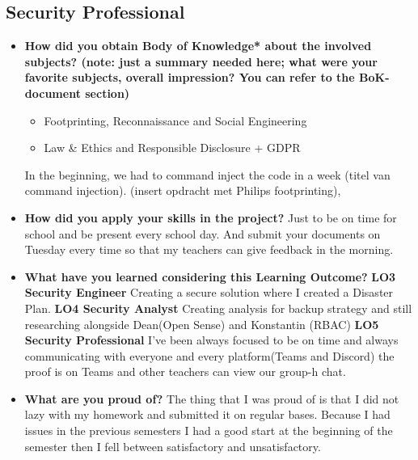 \documentclass[12pt, letterpaper]{article}
\begin{document}
\newpage
\subsection{Security Professional}
\begin{itemize}
\item \textbf{How did you obtain Body of Knowledge* about the involved subjects? (note: just a summary needed here; what were your favorite subjects, overall impression? You can refer to the BoK-document section)}
\begin{itemize}
    \item Footprinting, Reconnaissance and Social Engineering
    \item Law \& Ethics and Responsible Disclosure + GDPR
\end{itemize}
In the beginning, we had to command inject the code in a week (titel van command injection). (insert opdracht met Philips footprinting), 
\item \textbf{How did you apply your skills in the project?}
\hfill\break
\hfill\break
Just to be on time for school and be present every school day. And submit your documents on Tuesday every time so that my teachers can give feedback in the morning.
\item \textbf{What have you learned considering this Learning Outcome?}
\break
\textbf{LO3 Security Engineer}
\hfill\break
Creating a secure solution where I created a Disaster Plan.
\hfill\break
\textbf{LO4 Security Analyst}
\hfill\break
Creating analysis for backup strategy and still researching alongside Dean(Open Sense) and Konstantin (RBAC)
\hfill\break
\textbf{LO5 Security Professional}
\hfill\break
I've been always focused to be on time and always communicating with everyone and every platform(Teams and Discord) the proof is on Teams and other teachers can view our group-h chat.
\item \textbf{What are you proud of?}
\hfill\break
\hfill\break
The thing that I was proud of is that I did not lazy with my homework and submitted it on regular bases. Because I had issues in the previous semesters I had a good start at the beginning of the semester then I fell between satisfactory and unsatisfactory.


\end{itemize}
\end{document}
